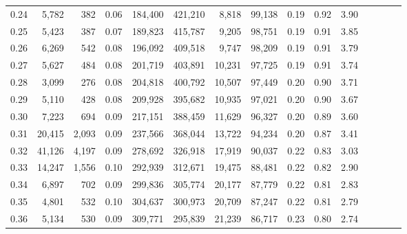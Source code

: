 \begin{tabular}{rrrcrrrrrrrrrrr}
0.24 &   5,782 &    382 &                                       0.06 &  184,400 &  421,210 &    8,818 &   99,138 &  0.19 &  0.92 &                         3.90 \\
0.25 &   5,423 &    387 &                                       0.07 &  189,823 &  415,787 &    9,205 &   98,751 &  0.19 &  0.91 &                         3.85 \\
0.26 &   6,269 &    542 &                                       0.08 &  196,092 &  409,518 &    9,747 &   98,209 &  0.19 &  0.91 &                         3.79 \\
0.27 &   5,627 &    484 &                                       0.08 &  201,719 &  403,891 &   10,231 &   97,725 &  0.19 &  0.91 &                         3.74 \\
0.28 &   3,099 &    276 &                                       0.08 &  204,818 &  400,792 &   10,507 &   97,449 &  0.20 &  0.90 &                         3.71 \\
0.29 &   5,110 &    428 &                                       0.08 &  209,928 &  395,682 &   10,935 &   97,021 &  0.20 &  0.90 &                         3.67 \\
0.30 &   7,223 &    694 &                                       0.09 &  217,151 &  388,459 &   11,629 &   96,327 &  0.20 &  0.89 &                         3.60 \\
0.31 &  20,415 &  2,093 &                                       0.09 &  237,566 &  368,044 &   13,722 &   94,234 &  0.20 &  0.87 &                         3.41 \\
0.32 &  41,126 &  4,197 &                                       0.09 &  278,692 &  326,918 &   17,919 &   90,037 &  0.22 &  0.83 &                         3.03 \\
0.33 &  14,247 &  1,556 &                                       0.10 &  292,939 &  312,671 &   19,475 &   88,481 &  0.22 &  0.82 &                         2.90 \\
0.34 &   6,897 &    702 &                                       0.09 &  299,836 &  305,774 &   20,177 &   87,779 &  0.22 &  0.81 &                         2.83 \\
0.35 &   4,801 &    532 &                                       0.10 &  304,637 &  300,973 &   20,709 &   87,247 &  0.22 &  0.81 &                         2.79 \\
0.36 &   5,134 &    530 &                                       0.09 &  309,771 &  295,839 &   21,239 &   86,717 &  0.23 &  0.80 &                         2.74 \\

\end{tabular}
